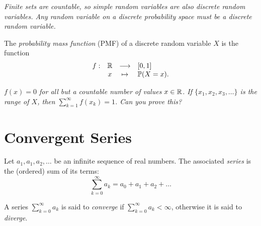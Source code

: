\begin{remark}
\bit
\it Finite sets are countable, so simple random variables are also discrete random variables.
\it Any random variable on a discrete probability space must be a discrete random variable.
\eit
\end{remark}

\begin{definition}
The \emph{probability mass function} (PMF) of a discrete random variable $X$ is the function
\[
\begin{array}{cccl}
f:	& \mathbb{R}	& \longrightarrow	& [0,1] \\
	& x 			& \mapsto			& \mathbb{P}(X = x).
\end{array}
\]
\end{definition}

\begin{remark}
\ben
\it $f(x)=0$ for all but a countable number of values $x\in\mathbb{R}$.
\it If $\{x_1,x_2,x_3,\ldots\}$ is the range of $X$, then $\sum_{k=1}^{\infty} f(x_k) = 1$. Can you prove this?
\een
\end{remark}


\section{Convergent Series}
Let $a_1,a_1,a_2,\ldots$ be an infinite sequence of real numbers. The associated \emph{series} is the (ordered) sum of its terms:
\[
\sum_{k=0}^{\infty} a_k = a_0 + a_1 + a_2 + \ldots
\]

\begin{definition}
A series $\displaystyle\sum_{k=0}^{\infty} a_k$ is said to \emph{converge} if $\displaystyle\sum_{k=0}^{\infty} a_k < \infty$, otherwise it is said to \emph{diverge}.
\end{definition}

%

